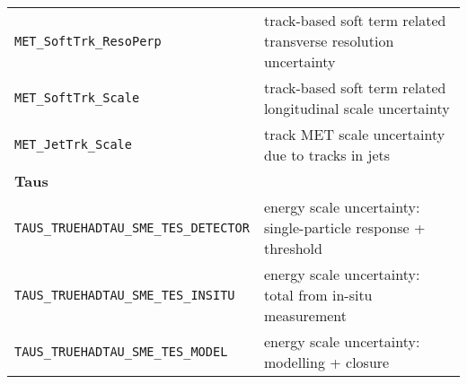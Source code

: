 \begin{longtable}{p{}p{}}
  \texttt{MET\_SoftTrk\_ResoPerp} &  track-based soft term related transverse resolution uncertainty \\
  \texttt{MET\_SoftTrk\_Scale} & track-based soft term related longitudinal scale uncertainty \\
  \texttt{MET\_JetTrk\_Scale} & track MET scale uncertainty due to tracks in jets \\
  {\bfseries Taus}&\\
  \texttt{TAUS\_TRUEHADTAU\_SME\_TES\_DETECTOR} & energy scale uncertainty: single-particle response + threshold \\
  \texttt{TAUS\_TRUEHADTAU\_SME\_TES\_INSITU} & energy scale uncertainty: total from in-situ measurement \\
  \texttt{TAUS\_TRUEHADTAU\_SME\_TES\_MODEL} & energy scale uncertainty: modelling + closure \\
  \bottomrule
\end{longtable}